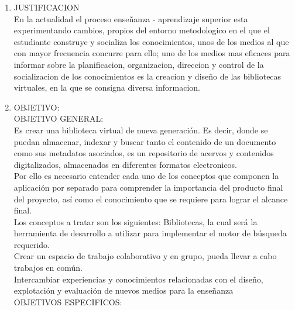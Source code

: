 \begin{enumerate}[1.]
\item JUSTIFICACION 
	\\ En la actualidad el proceso enseñanza - aprendizaje superior esta experimentando cambios, propios del entorno metodologico en el que el estudiante construye y socializa los conocimientos, unos de los medios al que con mayor frecuencia concurre para ello; uno de los medios mas eficaces para informar sobre la planificacion, organizacion, direccion y control de la socializacion de los conocimientos es la creacion y diseño de las bibliotecas virtuales, en la que se consigna diversa informacion.
	
\item OBJETIVO:
\\ OBJETIVO GENERAL:
\\ Es crear una biblioteca virtual de nueva generación.
Es decir, donde se puedan almacenar, indexar y buscar tanto el contenido de un documento como sus metadatos asociados, es un repositorio de acervos y contenidos digitalizados, almacenados en diferentes formatos electronicos.
\\ Por ello es necesario entender cada uno de los conceptos que componen la aplicación por separado para comprender la importancia del producto final del 	proyecto, así como el conocimiento que se requiere para lograr el alcance final.
\\ Los conceptos a tratar son los siguientes: Bibliotecas, la cual será la herramienta de desarrollo a utilizar para implementar el motor de búsqueda requerido. 
\\ Crear un espacio de trabajo colaborativo y en grupo, pueda llevar a cabo trabajos en común.
\\ Intercambiar experiencias y conocimientos relacionadas con el diseño, explotación y evaluación de nuevos medios para la enseñanza
\\ OBJETIVOS ESPECIFICOS:
\\ 

\end{enumerate} 
